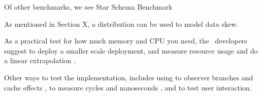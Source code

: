 Of other benchmarks, we see Star Schema Benchmark \cite{Boncz2002-yj}

As mentioned in Section X, a  distribution can be used to model data skew.

As a practical test for how much memory and CPU you need, the \qlikview~developers suggest to deploy a smaller scale deployment, and measure resource usage and do a linear extrapolation \cite{Qlik2011-yc}.

Other ways to test the implementation, includes using  to observer branches and cache effects \cite{Neumann2011-uq},  to measure cycles and nanoseconds \cite{Willhalm2013-ri}, and  to test user interaction.
